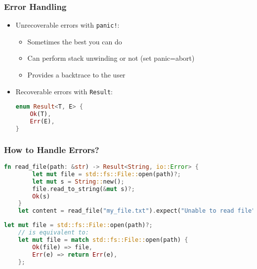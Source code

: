\begin{frame}[fragile]
    \frametitle{Error Handling}

    \begin{itemize}
        \item Unrecoverable errors with \texttt{panic!}:
        \begin{itemize}
            \item Sometimes the best you can do
            \item Can perform stack unwinding or not (set panic=abort)
            \item Provides a backtrace to the user
        \end{itemize}

        \pause

        \item Recoverable errors with \texttt{Result}:
        \begin{lstlisting}[language=rust]
enum Result<T, E> {
    Ok(T),
    Err(E),
}
        \end{lstlisting}
    \end{itemize}
\end{frame}

\begin{frame}[fragile]
    \frametitle{How to Handle Errors?}

    \begin{lstlisting}[language=rust]
    fn read_file(path: &str) -> Result<String, io::Error> {
        let mut file = std::fs::File::open(path)?;
        let mut s = String::new();
        file.read_to_string(&mut s)?;
        Ok(s)
    }
    let content = read_file("my_file.txt").expect("Unable to read file");
    \end{lstlisting}

    \pause

    \begin{lstlisting}[language=rust]
    let mut file = std::fs::File::open(path)?;
    // is equivalent to:
    let mut file = match std::fs::File::open(path) {
        Ok(file) => file,
        Err(e) => return Err(e),
    };
    \end{lstlisting}
\end{frame}

